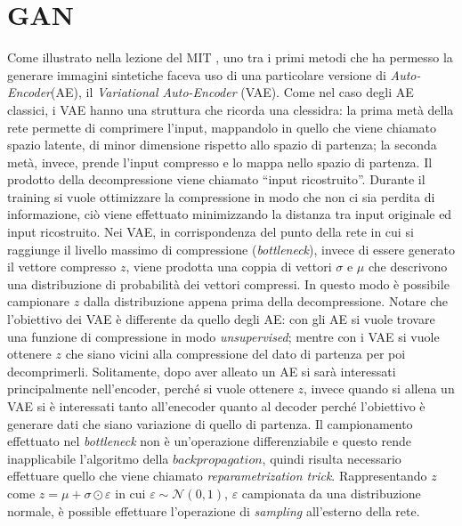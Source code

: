 


\section{GAN}
Come illustrato nella lezione del MIT \cite{MIT_GEN}, uno tra i primi metodi che ha permesso la generare immagini sintetiche faceva uso di una particolare versione di \emph{Auto-Encoder}(AE), il \emph{Variational Auto-Encoder} (VAE).
Come nel caso degli AE classici, i VAE hanno una struttura che ricorda una clessidra: la prima metà della rete permette di comprimere l'input, mappandolo in quello che viene chiamato spazio latente, di minor dimensione rispetto allo spazio di partenza;  la seconda metà, invece, prende l'input compresso e lo mappa nello spazio di partenza.
Il prodotto della decompressione viene chiamato ``input ricostruito''.
Durante il training si vuole ottimizzare la compressione in modo che non ci sia perdita di informazione, ciò viene effettuato minimizzando la distanza tra input originale ed input ricostruito.
Nei VAE, in corrispondenza del punto della rete in cui si raggiunge il livello massimo di compressione (\emph{bottleneck}), invece di essere generato il vettore compresso $z$, viene prodotta una coppia di vettori $\sigma$ e $\mu$ che descrivono una distribuzione di probabilità dei vettori compressi.
In questo modo è possibile campionare $z$ dalla distribuzione appena prima della decompressione.
Notare che l'obiettivo dei VAE è differente da quello degli AE: con gli AE si vuole trovare una funzione di compressione in modo \emph{unsupervised}; mentre con i VAE si vuole ottenere $z$ che siano vicini alla compressione del dato di partenza per poi decomprimerli.
Solitamente, dopo aver alleato un AE si sarà interessati principalmente nell'encoder, perché si vuole ottenere $z$, invece quando si allena un VAE si è interessati tanto all'enecoder quanto al decoder perché l'obiettivo è generare dati che siano variazione di quello di partenza.
Il campionamento effettuato nel \emph{bottleneck} non è un'operazione differenziabile e questo rende inapplicabile l'algoritmo della $backpropagation$, quindi risulta necessario effettuare quello che viene chiamato \emph{reparametrization trick}.
Rappresentando $z$ come $z = \mu + \sigma \odot \varepsilon$ in cui $\varepsilon \sim \mathcal{N}(0,1)$, $\varepsilon$ campionata da una distribuzione normale, è possible effettuare l'operazione di \emph{sampling} all'esterno della rete.
